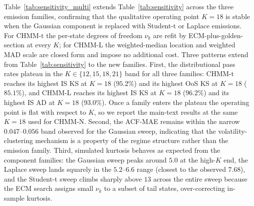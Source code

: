 Table~\ref{tab:sensitivity_multi} extends Table~\ref{tab:sensitivity} across the three emission families, confirming that the qualitative operating point $K = 18$ is stable when the Gaussian component is replaced with Student-t or Laplace emissions.
For CHMM-t the per-state degrees of freedom $\nu_k$ are refit by ECM-plus-golden-section at every $K$; for CHMM-L the weighted-median location and weighted MAD scale are closed form and impose no additional cost.
Three patterns extend from Table~\ref{tab:sensitivity} to the new families.
First, the distributional pass rates plateau in the $K \in \{12, 15, 18, 21\}$ band for all three families: CHMM-t reaches its highest IS KS at $K = 18$ ($95.2\%$) and its highest OoS KS at $K = 18$ ($85.1\%$), and CHMM-L reaches its highest IS KS at $K = 18$ ($96.2\%$) and its highest IS AD at $K = 18$ ($93.0\%$).
Once a family enters the plateau the operating point is flat with respect to $K$, so we report the main-text results at the same $K = 18$ used for CHMM-N.
Second, the ACF-MAE remains within the narrow $0.047$--$0.056$ band observed for the Gaussian sweep, indicating that the volatility-clustering mechanism is a property of the regime structure rather than the emission family.
Third, simulated kurtosis behaves as expected from the component families: the Gaussian sweep peaks around $5.0$ at the high-$K$ end, the Laplace sweep lands squarely in the $5.2$--$6.6$ range (closest to the observed $7.68$), and the Student-t sweep climbs sharply above $13$ across the entire sweep because the ECM search assigns small $\nu_k$ to a subset of tail states, over-correcting in-sample kurtosis.

